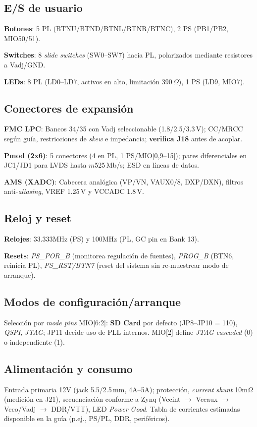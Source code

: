 \documentclass[a4paper,12pt]{article}
\begin{document}
\subsection{E/S de usuario}
\textbf{Botones}: 5 PL (BTNU/BTND/BTNL/BTNR/BTNC), 2 PS (PB1/PB2, MIO50/51). 

\textbf{Switches}: 8 \emph{slide switches} (SW0–SW7) hacia PL, polarizados mediante resistores a Vadj/GND. 

\textbf{LEDs}: 8 PL (LD0–LD7, activos en alto, limitación 390\,\(\Omega\)), 1 PS (LD9, MIO7). 

\subsection{Conectores de expansión}
\textbf{FMC LPC}: Bancos 34/35 con Vadj seleccionable (1.8/2.5/3.3\,V); CC/MRCC según guía, restricciones de \emph{skew} e impedancia; \textbf{verifica J18} antes de acoplar.

\textbf{Pmod (2x6)}: 5 conectores (4 en PL, 1 PS/MIO[0,9–15]); pares diferenciales en JC1/JD1 para LVDS hasta \(m\)525\,Mb/s; ESD en líneas de datos. 

\textbf{AMS (XADC)}: Cabecera analógica (VP/VN, VAUX0/8, DXP/DXN), filtros anti-\emph{aliasing}, VREF 1.25\,V y VCCADC 1.8\,V. 

\subsection{Reloj y reset}
\textbf{Relojes}: {33.333}{MHz} (PS) y {100}{MHz} (PL, GC pin en Bank 13). 

\textbf{Resets}: \emph{PS\_POR\_B} (monitorea regulación de fuentes), \emph{PROG\_B} (BTN6, reinicia PL), \emph{PS\_RST/BTN7} (reset del sistema sin re-muestrear modo de arranque). 

\subsection{Modos de configuración/arranque}
Selección por \emph{mode pins} MIO[6:2]: \textbf{SD Card} por defecto (JP8–JP10 = 110), \emph{QSPI}, \emph{JTAG}; JP11 decide uso de PLL internos. MIO[2] define \emph{JTAG cascaded} (0) o independiente (1). 

\subsection{Alimentación y consumo}
Entrada primaria {12}{V} (jack 5.5/2.5\,mm, {4}{A}–{5}{A}); protección, \emph{current shunt} {10}{m$\Omega$} (medición en J21), secuenciación conforme a Zynq (Vccint \(\rightarrow\) Vccaux \(\rightarrow\) Vcco/Vadj \(\rightarrow\) DDR/VTT), LED \emph{Power Good}. Tabla de corrientes estimadas disponible en la guía (p.ej., PS/PL, DDR, periféricos).
\end{document}
